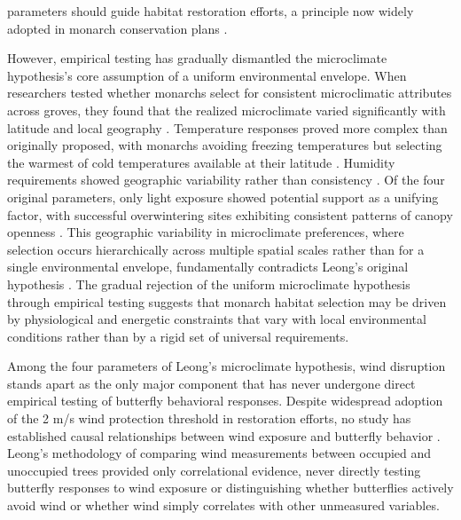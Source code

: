 parameters should guide habitat restoration efforts, a principle now widely adopted in monarch conservation plans \parencite{xercessocietyStateMonarchOverwintering2016,jepsenProtectingCaliforniasButterfly2017,peltonMonarchButterflyOverwintering2020,weissRecommendationsRestorationMonarch2008,althouse&meadeinc.EllwoodMesaSperling2023}.

However, empirical testing has gradually dismantled the microclimate hypothesis's core assumption of a uniform environmental envelope. When researchers tested whether monarchs select for consistent microclimatic attributes across groves, they found that the realized microclimate varied significantly with latitude and local geography \parencite{sanieeHierarchyScaleInfluence2022}. Temperature responses proved more complex than originally proposed, with monarchs avoiding freezing temperatures but selecting the warmest of cold temperatures available at their latitude \parencite{fisherClimaticNicheModel2018}. Humidity requirements showed geographic variability rather than consistency \parencite{sanieeHierarchyScaleInfluence2022}. Of the four original parameters, only light exposure showed potential support as a unifying factor, with successful overwintering sites exhibiting consistent patterns of canopy openness \parencite{sanieeHierarchyScaleInfluence2022,weissForestCanopyStructure1991}. This geographic variability in microclimate preferences, where selection occurs hierarchically across multiple spatial scales rather than for a single environmental envelope, fundamentally contradicts Leong's original hypothesis \parencite{fisherClimaticNicheModel2018,sanieeHierarchyScaleInfluence2022}. The gradual rejection of the uniform microclimate hypothesis through empirical testing suggests that monarch habitat selection may be driven by physiological and energetic constraints that vary with local environmental conditions rather than by a rigid set of universal requirements.

Among the four parameters of Leong's microclimate hypothesis, wind disruption stands apart as the only major component that has never undergone direct empirical testing of butterfly behavioral responses. Despite widespread adoption of the 2 m/s wind protection threshold in restoration efforts, no study has established causal relationships between wind exposure and butterfly behavior \parencite{xercessocietyManagingMonarchsWest2018,jepsenProtectingCaliforniasButterfly2017,althouse&meadeinc.EllwoodMesaSperling2023,u.s.fishandwildlifeserviceMonarchDanausPlexippus2024,weissAlbanyHillMonarch2018,leongEvaluationManagementCalifornia2016}. Leong's methodology of comparing wind measurements between occupied and unoccupied trees provided only correlational evidence, never directly testing butterfly responses to wind exposure or distinguishing whether butterflies actively avoid wind or whether wind simply correlates with other unmeasured variables.

